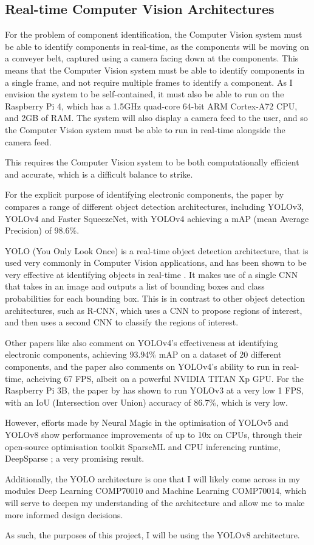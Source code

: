 \subsection{Real-time Computer Vision Architectures}
For the problem of component identification, the Computer Vision system must be able to identify components in real-time, as the components will be moving on a conveyer belt, captured using
a camera facing down at the components. This means that the Computer Vision system must be able to identify components in a single frame, and not require multiple frames to identify a component.
As I envision the system to be self-contained, it must also be able to run on the Raspberry Pi 4, which has a 1.5GHz quad-core 64-bit ARM Cortex-A72 CPU, and 2GB of RAM. 
The system will also display a camera feed to the user, and so the Computer Vision system must be able to run in real-time alongside the camera feed.

This requires the Computer Vision system to be both computationally efficient and accurate, which is a difficult balance to strike.

For the explicit purpose of identifying electronic components, the paper by \citet{s22239079} compares a range of different object detection architectures, including YOLOv3, YOLOv4 and Faster SqueezeNet, with YOLOv4 achieving a mAP (mean Average Precision) of 98.6\%.

YOLO (You Only Look Once) is a real-time object detection architecture, that is used very commonly in Computer Vision applications, and has been shown to be very effective at identifying objects in real-time \citet{yolo}. It makes
use of a single CNN that takes in an image and outputs a list of bounding boxes and class probabilities for each bounding box. This is in contrast to other object detection architectures, such as R-CNN, which uses a CNN to propose regions of interest, and then uses a second CNN to classify the regions of interest.

Other papers like \citet{Guo2021} also comment on YOLOv4's effectiveness at identifying electronic components, achieving 93.94\% mAP on a dataset of 20 different components, and the paper also comments
on YOLOv4's ability to run in real-time, acheiving 67 FPS, albeit on a powerful NVIDIA TITAN Xp GPU. For the Raspberry Pi 3B, the paper by \citet{9166199} has shown to run YOLOv3 at a very low 1 FPS,
with an IoU (Intersection over Union) accuracy of 86.7\%, which is very low. 

However, efforts made by Neural Magic \cite{neuralmagic} in the optimisation of YOLOv5 and YOLOv8 show performance improvements of up to 10x on CPUs, through their open-source 
optimisation toolkit SparseML \cite{sparseml} and CPU inferencing runtime, DeepSparse \cite{deepsparse}; a very promising result.

Additionally, the YOLO architecture is one that I will likely come across in my modules Deep Learning COMP70010 and Machine Learning COMP70014, which will serve
to deepen my understanding of the architecture and allow me to make more informed design decisions.

As such, the purposes of this project, I will be using the YOLOv8 architecture.

